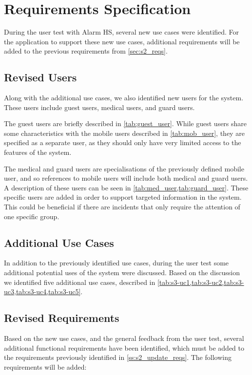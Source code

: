 \section{Requirements Specification} \label{sec:s3_requirements}
During the user test with Alarm HS, several new use cases were identified. For the application to support these new use cases, additional requirements will be added to the previous requirements from \cref{sec:s2_reqs}.

\subsection{Revised Users} \label{ss:s3_users}
Along with the additional use cases, we also identified new users for the system. These users include guest users, medical users, and guard users.

The guest users are briefly described in \cref{tab:guest_user}. While guest users share some characteristics with the mobile users described in \cref{tab:mob_user}, they are specified as a separate user, as they should only have very limited access to the features of the system.

The medical and guard users are specialisations of the previously defined mobile user, and so references to mobile users will include both medical and guard users. A description of these users can be seen in \cref{tab:med_user,tab:guard_user}. These specific users are added in order to support targeted information in the system. This could be beneficial if there are incidents that only require the attention of one specific group.



\subsection{Additional Use Cases \label{ss:s3_uc}}
In addition to the previously identified use cases, during the user test some additional potential uses of the system were discussed. Based on the discussion we identified five additional use cases, described in \cref{tab:s3-uc1,tab:s3-uc2,tab:s3-uc3,tab:s3-uc4,tab:s3-uc5}.



\subsection{Revised Requirements} \label{ss:s2_reqs}
Based on the new use cases, and the general feedback from the user test, several additional functional requirements have been identified, which must be added to the requirements previously identified in \cref{ss:s2_update_reqs}. The following requirements will be added:


